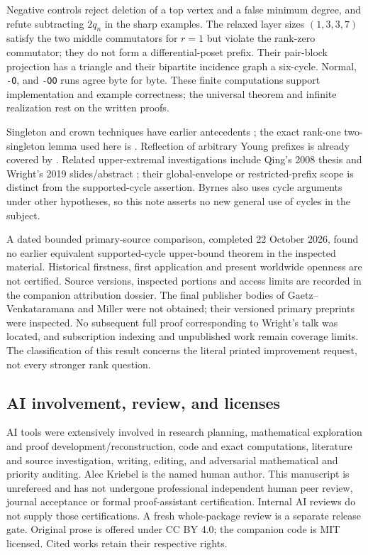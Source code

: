 \documentclass[11pt]{article}
\theoremstyle{remark}
\begin{document}
Negative controls reject deletion of a top vertex and a false minimum degree,
and refute subtracting $2q_n$ in the sharp examples. The relaxed layer sizes
$(1,3,3,7)$ satisfy the two middle commutators for $r=1$ but violate the
rank-zero commutator; they do not form a differential-poset prefix.
Their pair-block projection has a triangle and their bipartite incidence
graph a six-cycle. Normal, \texttt{-O}, and \texttt{-OO} runs agree byte for
byte. These finite computations support implementation and example
correctness; the universal theorem and infinite realization rest on the
written proofs.

Singleton and crown techniques have earlier antecedents
\cite{Lewis,MR}; the exact rank-one two-singleton lemma used here is
\cite[Proposition~3.4]{GV}. Reflection of arbitrary Young prefixes is already
covered by \cite{Stanley}. Related upper-extremal investigations include
Qing's 2008 thesis and Wright's 2019 slides/abstract \cite{Qing,Wright};
their global-envelope or restricted-prefix scope is distinct from the
supported-cycle assertion. Byrnes also uses cycle arguments under other
hypotheses, so this note asserts no new general use of cycles in the subject.

A dated bounded primary-source comparison, completed 22 October 2026,
found no earlier equivalent supported-cycle upper-bound theorem in the
inspected material. Historical firstness, first application and present
worldwide openness are not certified. Source versions, inspected portions
and access limits are recorded in the companion attribution dossier.
The final publisher bodies of Gaetz--Venkataramana and Miller were not
obtained; their versioned primary preprints were inspected. No subsequent
full proof corresponding to Wright's talk was located, and subscription
indexing and unpublished work remain coverage limits. The classification
of this result concerns the literal printed improvement request, not every
stronger rank question.

\subsection*{AI involvement, review, and licenses}
AI tools were extensively involved in research planning, mathematical
exploration and proof development/reconstruction, code and exact computations,
literature and source investigation, writing, editing, and adversarial
mathematical and priority auditing. Alec Kriebel is the named human author.
This manuscript is unrefereed and has not undergone professional independent
human peer review, journal acceptance or formal proof-assistant certification.
Internal AI reviews do not supply those certifications. A fresh whole-package
review is a separate release gate. Original prose is offered under CC BY 4.0;
the companion code is MIT licensed. Cited works retain their respective rights.
\end{document}
